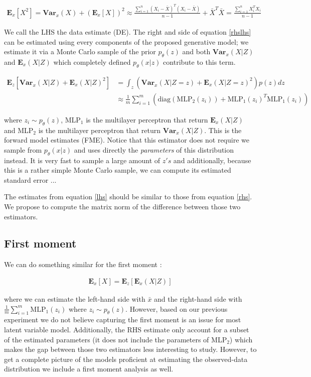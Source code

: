 \documentclass{article}
\newcommand{\Vx}{\textbf{Var}_x}
\newcommand{\Ex}{\textbf{E}_x}
\newcommand{\Ez}{\textbf{E}_z}
\begin{document}
\begin{align}
\Ex[X^2] = \Vx(X)+ (\Ex[X])^2 \approx \frac{\sum_{i=1}^n(X_i-\bar{X})^T(X_i-\bar{X})}{n-1} + \bar{X}^T\bar{X} = \frac{\sum_{i=1}^n X_i^TX_i}{n-1}
\label{lhs}
\end{align}

We call the LHS the data estimate (DE). The right and side of equation \ref{rhslhs} can be estimated using every components of the proposed generative model; we estimate it via a Monte Carlo sample of the prior $p_\theta(z)$ and both $\Vx(X|Z)$ and $\Ex(X|Z)$ which completely defined $p_\theta(x|z)$ contribute to this term. 

\begin{align}
\Ez[\Vx(X|Z) + \Ex(X|Z)^2] &= \int_z (\Vx(X|Z=z)+\Ex(X|Z=z)^2)p(z) dz \\ 
&\approx \frac{1}{m} \sum_{i=1}^m ( \text{diag}(\text{MLP}_2(z_i)) + \text{MLP}_1(z_i)^T\text{MLP}_1(z_i))
\label{rhs}
\end{align}

where $z_i \sim p_\theta(z)$, MLP$_1$ is the multilayer perceptron that return $\Ex(X|Z)$ and MLP$_2$ is the multilayer perceptron that return $\Vx(X|Z)$. This is the forward model estimates (FME). Notice that this estimator does not require we sample from $p_\theta(x|z)$ and uses directly the \textit{parameters} of this distribution instead. It is very fast to sample a large amount of $z's$ and additionally, because this is a rather simple Monte Carlo sample, we can compute its estimated standard error ...

\bigskip

The estimates from equation \ref{lhs} should be similar to those from equation \ref{rhs}. We propose to compute the matrix norm of the difference between those two estimators.

\subsection{First moment}

We can do something similar for the first moment :

\begin{align}
\Ex[X] = \Ez[\Ex(X|Z)] 
\label{rhs}
\end{align}

where we can estimate the left-hand side with $\bar{x}$ and the right-hand side with $\frac{1}{m} \sum_{i=1}^m \text{MLP}_1(z_i)$ where $z_i \sim p_\theta(z)$. However, based on our previous experiment we do not believe capturing the first moment is an issue for most latent variable model. Additionally, the RHS estimate only account for a subset of the estimated parameters (it does not include the parameters of MLP$_2$) which makes the gap between those two estimators less interesting to study. However, to get a complete picture of the models proficient at estimating the observed-data distribution we include a first moment analysis as well. 
\end{document}
